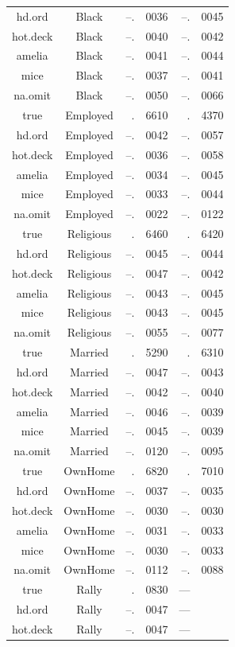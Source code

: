\documentclass[12pt,econ]{sources/authesis}
\begin{document}
\begin{longtable}{ccr@{}lr@{}l}
 hd.ord & Black & --.&0036 & --.&0045 \\
 hot.deck & Black & --.&0040 & --.&0042 \\
 amelia & Black & --.&0041 & --.&0044 \\ 
 mice & Black & --.&0037 & --.&0041 \\ 
 na.omit & Black & --.&0050 & --.&0066 \\ 
 true & Employed & .&6610 & .&4370 \\ 
 hd.ord & Employed & --.&0042 & --.&0057 \\ 
 hot.deck & Employed & --.&0036 & --.&0058 \\ 
 amelia & Employed & --.&0034 & --.&0045 \\ 
 mice & Employed & --.&0033 & --.&0044 \\ 
 na.omit & Employed & --.&0022 & --.&0122 \\ 
 true & Religious & .&6460 & .&6420 \\
 hd.ord & Religious & --.&0045 & --.&0044 \\
 hot.deck & Religious & --.&0047 & --.&0042 \\
 amelia & Religious & --.&0043 & --.&0045 \\ 
 mice & Religious & --.&0043 & --.&0045 \\ 
 na.omit & Religious & --.&0055 & --.&0077 \\ 
 true & Married & .&5290 & .&6310 \\ 
 hd.ord & Married & --.&0047 & --.&0043 \\ 
 hot.deck & Married & --.&0042 & --.&0040 \\
 amelia & Married & --.&0046 & --.&0039 \\ 
 mice & Married & --.&0045 & --.&0039 \\ 
 na.omit & Married & --.&0120 & --.&0095 \\
 true & OwnHome & .&6820 & .&7010 \\
 hd.ord & OwnHome & --.&0037 & --.&0035 \\ 
 hot.deck & OwnHome & --.&0030 & --.&0030 \\
 amelia & OwnHome & --.&0031 & --.&0033 \\
 mice & OwnHome & --.&0030 & --.&0033 \\ 
 na.omit & OwnHome & --.&0112 & --.&0088 \\ 
 true & Rally & .&0830 & --- \\ 
 hd.ord & Rally & --.&0047 & --- \\ 
 hot.deck & Rally & --.&0047 & --- \\ 

\end{longtable}
\end{document}
